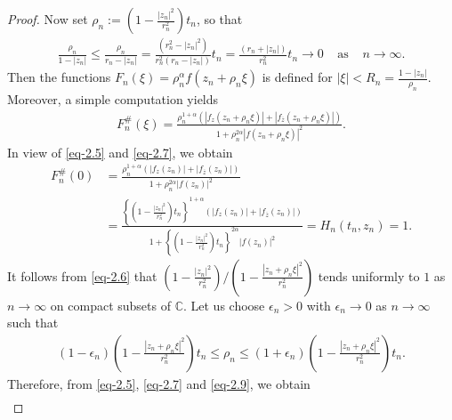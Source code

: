 \documentclass[a4paper,12pt]{amsart}
\theoremstyle{plain}
\theoremstyle{definition}
\begin{document}
\begin{proof}
Now set $\rho_n:=\left(1- \frac{|z_n|^2}{r^2_n}\right)t_n$, so that
\begin{align}\label{eq-2.6}
	\frac{\rho_n}{1-|z_n|}\leq \frac{\rho_n}{r_n -|z_n|}= \frac{(r^2_n -|z_n|^2)}{r^2_n(r_n -|z_n|)}t_n= \frac{(r_n +|z_n|)}{r^2_n} t_n \rightarrow 0 \;\;\;\;\mbox{as} \;\;\;\;n\rightarrow \infty.
\end{align}
Then the functions $F_n(\xi)=\rho^{\alpha}_n f(z_n+\rho_n\xi)$ is defined for $|\xi|<R_n=\frac{1-|z_n|}{\rho_n}$. Moreover, a simple computation yields
\begin{align}\label{eq-2.7}
	F^{\#}_n(\xi)= \frac{\rho^{1+\alpha}_n\left(|f_z(z_n+\rho_n\xi)| + |f_{\overline{z}}(z_n+\rho_n\xi)|\right)}{1+\rho^{2\alpha}_n |f(z_n+\rho_n\xi)|^2}.
\end{align}
In view of \eqref{eq-2.5} and \eqref{eq-2.7}, we obtain
\begin{align}\label{eq-2.8}
	F^{\#}_n(0) \nonumber&= \frac{\rho^{1+\alpha}_n\left(|f_z(z_n)| + |f_{\overline{z}}(z_n)|\right)}{1+\rho^{2\alpha}_n |f(z_n)|^2}\\&= \frac{\left\{\left(1- \frac{|z_n|^2}{r^2_n}\right)t_n \right\} ^{1+\alpha}\left(|f_z(z_n)| + |f_{\overline{z}}(z_n)|\right)} {1+\left\{\left(1- \frac{|z_n|^2}{r^2_n}\right)t_n \right\}^{2\alpha} |f(z_n)|^2} = H_n(t_n,z_n)=1.
\end{align}
It follows from \eqref{eq-2.6} that $\left(1- \frac{|z_n|^2}{r^2_n} \right)/\left(1- \frac{|z_n+ \rho_n\xi|^2}{r^2_n}\right)$ tends uniformly to $1$ as $n\rightarrow\infty$ on compact subsets of $\mathbb{C}$. Let us choose $\epsilon_n>0$ with $\epsilon_n\rightarrow 0$ as $n\rightarrow\infty$ such that
\begin{align}\label{eq-2.9}
	(1-\epsilon_n)\left(1- \frac{|z_n+ \rho_n\xi|^2}{r^2_n}\right)t_n \leq\rho_n\leq (1+\epsilon_n)\left(1- \frac{|z_n+ \rho_n\xi|^2} {r^2_n}\right)t_n.
\end{align}
Therefore, from \eqref{eq-2.5}, \eqref{eq-2.7} and \eqref{eq-2.9}, we obtain
\begin{align}\label{eq-2.10}

\end{align}
\end{proof}
\end{document}
